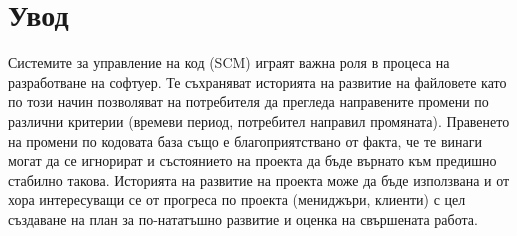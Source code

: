 \documentclass[a4paper]{article}
\begin{document}
% 
% 
% 
% 
% 
% 
% 
%
%
%

% 


\section{Увод}
Системите за управление на код (SCM) играят важна роля в процеса на
разработване на софтуер. Те съхраняват историята на развитие на файловете като
по този начин позволяват на потребителя да прегледа направените промени по
различни критерии (времеви период, потребител направил промяната).
Правенето на промени по кодовата база също е благоприятствано от факта, че те
винаги могат да се игнорират и състоянието на проекта да бъде върнато към
предишно стабилно такова. Историята на развитие на проекта може да бъде
използвана и от хора интересуващи се от прогреса по проекта (мениджъри,
клиенти) с цел създаване на план за по-нататъшно развитие и оценка на свършената
работа.
\end{document}

